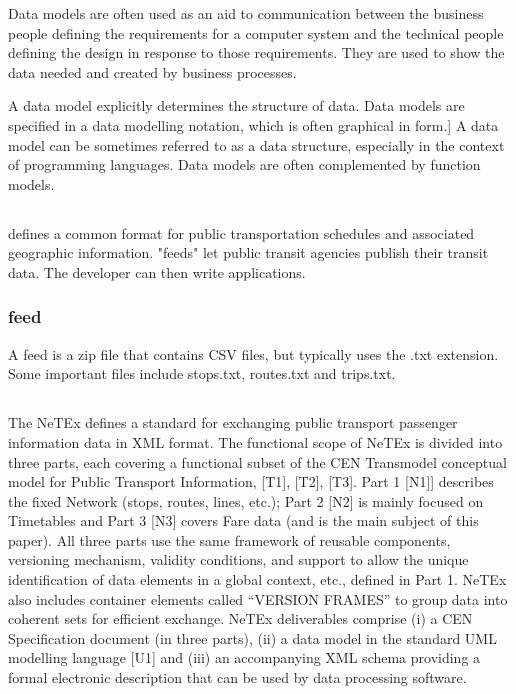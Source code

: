 Data models are often used as an aid to communication between the business people defining the requirements for a computer system and the technical people defining the design in response to those requirements. They are used to show the data needed and created by business processes.
 
A data model explicitly determines the structure of data. Data models are specified in a data modelling notation, which is often graphical in form.]
A data model can be sometimes referred to as a data structure, especially in the context of programming languages. Data models are often complemented by function models.
\subsection{}
 defines a common format for public transportation schedules and associated geographic information. "feeds" let public transit agencies publish their transit data. The developer can then write applications.
\subsubsection{ feed}
A feed is a zip file that contains CSV files, but typically uses the .txt extension. Some important files include stops.txt, routes.txt and trips.txt.


\subsection{}
The NeTEx defines a standard for exchanging public transport passenger information data in XML format. The functional
scope of NeTEx is divided into three parts, each covering a functional subset of the CEN Transmodel conceptual
model for Public Transport Information, [T1], [T2], [T3].
Part 1 [N1]] describes the fixed Network (stops, routes, lines, etc.); Part 2 [N2] is mainly focused on Timetables and
Part 3 [N3] covers Fare data (and is the main subject of this paper). All three parts use the same framework of reusable
components, versioning mechanism, validity conditions, and support to allow the unique identification of data elements
in a global context, etc., defined in Part 1. NeTEx also includes container elements called “VERSION FRAMES”
to group data into coherent sets for efficient exchange.
NeTEx deliverables comprise (i) a CEN Specification document (in three parts), (ii) a data model in the standard UML
modelling language [U1] and (iii) an accompanying XML schema providing a formal electronic description that can
be used by data processing software.

